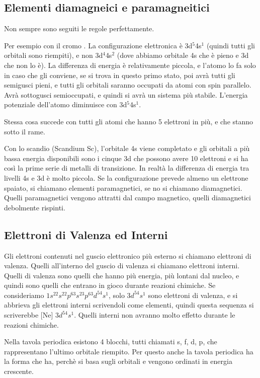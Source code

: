 \documentclass[a4paper]{article}
\begin{document}
\subsection{Elementi diamagneici e paramagneitici}
Non sempre sono seguiti le regole perfettamente. 

Per esempio con il cromo . La configurazione elettronica è 3d$^5$4s$^1$ (quindi tutti gli orbitali sono riempiti), e non 3d$^4$4s$^2$ (dove abbiamo orbitale 4s che è pieno e 3d che non lo è). La differenza di energia è relativamente piccola, e l'atomo lo fa solo in caso che gli conviene, se si trova in questo primo stato, poi avrà tutti gli semigusci pieni, e tutti gli orbitali saranno occupati da atomi con spin parallelo. Avrà sottogusci semioccupati, e quindi si avrà un sistema più stabile. L'energia potenziale dell'atomo diminuisce con 3d$^5$4s$^1$. 

Stessa cosa succede con tutti gli atomi che hanno 5 elettroni in più, e che stanno sotto il rame. 

Con lo scandio (Scandium Sc), l'orbitale 4s viene completato e gli orbitali a più bassa energia disponibili sono i cinque 3d che possono avere 10 elettroni e si ha così la prime serie di metalli di transizione. In realtà la differenza di energia tra livelli 4s e 3d è molto piccola. Se la configurazione prevede almeno un elettrone spaiato, si chiamano elementi paramagnetici, se no si chiamano diamagnetici. Quelli paramagnetici vengono attratti dal campo magnetico, quelli diamagnetici debolmente rispinti. 

\subsection{Elettroni di Valenza ed Interni}
Gli elettroni contenuti nel guscio elettronico più esterno si chiamano elettroni di valenza. Quelli all'interno del guscio di valenza si chiamano elettroni interni. Quelli di valenza sono quelli che hanno più energia, più lontani dal nucleo, e quindi sono quelli che entrano in gioco durante reazioni chimiche. Se consideriamo $1s^22s^22p^63s^23p^63d^54s^1$, solo $3d^54s^1$ sono elettroni di valenza, e si abbrieva gli elettroni interni scrivendoli come elementi, quindi questa sequenza si scriverebbe [Ne] $3d^54s^1$. Quelli interni non avranno molto effetto durante le reazioni chimiche. 

Nella tavola periodica esistono 4 blocchi, tutti chiamati s, f, d, p, che rappresentano l'ultimo orbitale riempito. Per questo anche la tavola periodica ha la forma che ha, perchè si basa sugli orbitali e vengono ordinati in energia crescente. 
\end{document}
